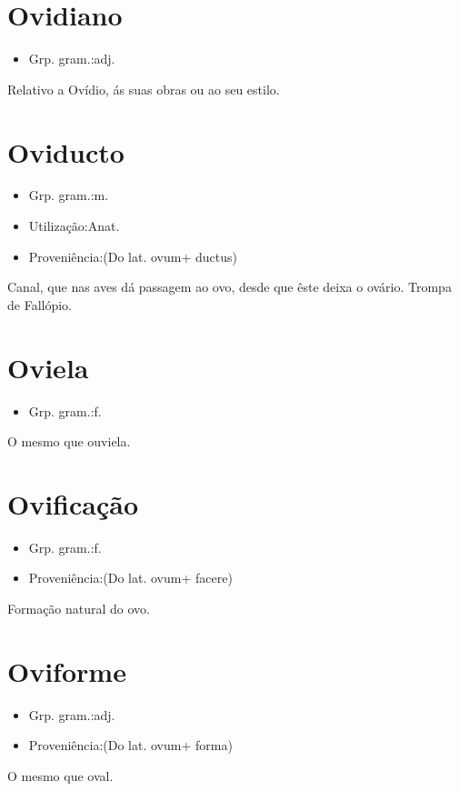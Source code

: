 \section{Ovidiano}
\begin{itemize}
\item {Grp. gram.:adj.}
\end{itemize}
Relativo a Ovídio, ás suas obras ou ao seu estilo.
\section{Oviducto}
\begin{itemize}
\item {Grp. gram.:m.}
\end{itemize}
\begin{itemize}
\item {Utilização:Anat.}
\end{itemize}
\begin{itemize}
\item {Proveniência:(Do lat. \textunderscore ovum\textunderscore  + \textunderscore ductus\textunderscore )}
\end{itemize}
Canal, que nas aves dá passagem ao ovo, desde que êste deixa o ovário.
Trompa de Fallópio.
\section{Oviela}
\begin{itemize}
\item {Grp. gram.:f.}
\end{itemize}
O mesmo que \textunderscore ouviela\textunderscore .
\section{Ovificação}
\begin{itemize}
\item {Grp. gram.:f.}
\end{itemize}
\begin{itemize}
\item {Proveniência:(Do lat. \textunderscore ovum\textunderscore  + \textunderscore facere\textunderscore )}
\end{itemize}
Formação natural do ovo.
\section{Oviforme}
\begin{itemize}
\item {Grp. gram.:adj.}
\end{itemize}
\begin{itemize}
\item {Proveniência:(Do lat. \textunderscore ovum\textunderscore  + \textunderscore forma\textunderscore )}
\end{itemize}
O mesmo que \textunderscore oval\textunderscore .
